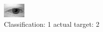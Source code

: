 \begin{figure}[h!]
\begin{center}
\includegraphics[width=0.60\columnwidth]{figures/ID394_class_1_target_2.png}
\end{center}
\caption{ Classification: 1 actual target: 2}
\label{fig:ID394_class_1_target_2}
\end{figure}
